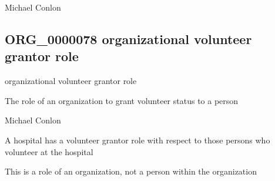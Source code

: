 \documentclass[letterpaper,10pt,english]{sphinxmanual}
\begin{document}
\begin{sphinxShadowBox}

\sphinxAtStartPar
Michael Conlon 
\end{sphinxShadowBox}
\begin{quote}

\ignorespaces \end{quote}


\subsection{ORG\_0000078 \sphinxhyphen{} organizational volunteer grantor role}
\label{\detokenize{doc-ORG_0000078:org-0000078-organizational-volunteer-grantor-role}}\label{\detokenize{doc-ORG_0000078:index-0}}\label{\detokenize{doc-ORG_0000078::doc}}
\begin{sphinxShadowBox}

\sphinxAtStartPar
organizational volunteer grantor role
\end{sphinxShadowBox}

\begin{sphinxShadowBox}

\sphinxAtStartPar
The role of an organization to grant volunteer status to a person
\end{sphinxShadowBox}

\begin{sphinxShadowBox}

\sphinxAtStartPar
Michael Conlon 
\end{sphinxShadowBox}

\begin{sphinxShadowBox}

\sphinxAtStartPar
A hospital has a volunteer grantor role with respect to those persons who volunteer at the hospital
\end{sphinxShadowBox}

\begin{sphinxShadowBox}

\sphinxAtStartPar
This is a role of an organization, not a person within the organization
\end{sphinxShadowBox}
\end{document}
